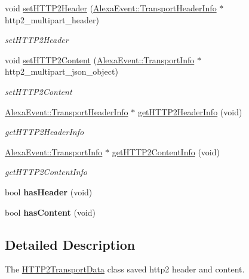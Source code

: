 \begin{DoxyCompactItemize}
\item 
void \hyperlink{classhttp2_1_1HTTP2TransportData_abbca034874381c8d2bde4af82ad50851}{set\+H\+T\+T\+P2\+Header} (\hyperlink{classAlexaEvent_1_1TransportHeaderInfo}{Alexa\+Event\+::\+Transport\+Header\+Info} $\ast$http2\+\_\+multipart\+\_\+header)
\begin{DoxyCompactList}\small\item\em set\+H\+T\+T\+P2\+Header \end{DoxyCompactList}\item 
void \hyperlink{classhttp2_1_1HTTP2TransportData_a2bb8e379cba530e84eb0516e3680cc5f}{set\+H\+T\+T\+P2\+Content} (\hyperlink{classAlexaEvent_1_1TransportInfo}{Alexa\+Event\+::\+Transport\+Info} $\ast$http2\+\_\+multipart\+\_\+json\+\_\+object)
\begin{DoxyCompactList}\small\item\em set\+H\+T\+T\+P2\+Content \end{DoxyCompactList}\item 
\hyperlink{classAlexaEvent_1_1TransportHeaderInfo}{Alexa\+Event\+::\+Transport\+Header\+Info} $\ast$ \hyperlink{classhttp2_1_1HTTP2TransportData_ada70894e2a9280bdc4e4fba74b4eb94e}{get\+H\+T\+T\+P2\+Header\+Info} (void)
\begin{DoxyCompactList}\small\item\em get\+H\+T\+T\+P2\+Header\+Info \end{DoxyCompactList}\item 
\hyperlink{classAlexaEvent_1_1TransportInfo}{Alexa\+Event\+::\+Transport\+Info} $\ast$ \hyperlink{classhttp2_1_1HTTP2TransportData_ae4c1a518b3a0a12e11204889ed9bcbea}{get\+H\+T\+T\+P2\+Content\+Info} (void)
\begin{DoxyCompactList}\small\item\em get\+H\+T\+T\+P2\+Content\+Info \end{DoxyCompactList}\item 
\mbox{\label{classhttp2_1_1HTTP2TransportData_a77a94312b7c3bd09956dc06ae6a88e74}} 
bool {\bfseries has\+Header} (void)
\item 
\mbox{\label{classhttp2_1_1HTTP2TransportData_a8b6e24e6a3c18b3fdef1ac0d8f472538}} 
bool {\bfseries has\+Content} (void)
\end{DoxyCompactItemize}


\subsection{Detailed Description}
The \hyperlink{classhttp2_1_1HTTP2TransportData}{H\+T\+T\+P2\+Transport\+Data} class saved http2 header and content. 

